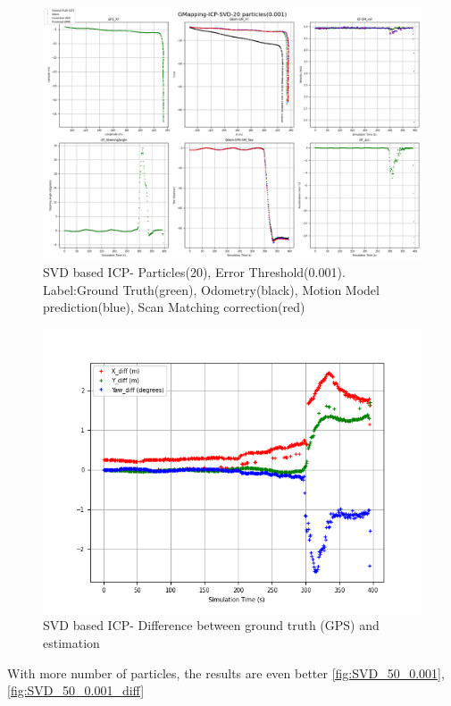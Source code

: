     \begin{figure}[h] 
        \includegraphics[height=0.6\textwidth]{images/GMapping-ICP-SVD-20 particles(0.001)_PositionParameters.png}
        \caption{SVD based ICP- Particles(20), Error Threshold(0.001). Label:Ground Truth(green), Odometry(black), Motion Model prediction(blue), Scan Matching correction(red)}
        \label{fig:SVD_20_0.001}
    \end{figure}
    \begin{figure}[h] 
        \includegraphics[height=0.4\textwidth]{images/GMapping-ICP-SVD-20 particles(0.001)_True_vs_Crct.png}
        \caption{SVD based ICP- Difference between ground truth (GPS) and estimation}
        \label{fig:SVD_20_0.001_diff}
    \end{figure}
\clearpage
With more number of particles, the results are even better \ref{fig:SVD_50_0.001}, \ref{fig:SVD_50_0.001_diff}
